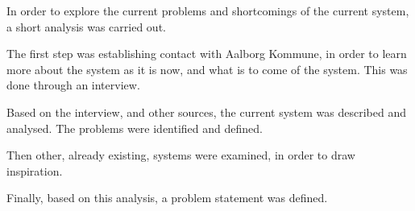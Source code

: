 In order to explore the current problems and shortcomings of the current \citybike system, a short analysis was carried out.

The first step was establishing contact with Aalborg Kommune, in order to learn more about the system as it is now, and what is to come of the system.
This was done through an interview.

Based on the interview, and other sources, the current system was described and analysed.
The problems were identified and defined.

Then other, already existing, systems were examined, in order to draw inspiration.

Finally, based on this analysis, a problem statement was defined.